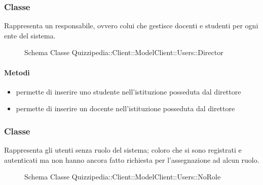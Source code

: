 \subsubsection{Classe }
Rappresenta un responsabile, ovvero colui che gestisce docenti e studenti per ogni ente del sistema.
\begin{figure}[H]
\centering
\noindent{}
\caption[Schema Classe Director]{Schema Classe Quizzipedia::Client::ModelClient::Users::Director}
\end{figure}
\paragraph{Metodi}
\begin{itemize}
\item {}
\newline
permette di inserire uno studente nell'istituzione posseduta dal direttore
\newline
\item {}
\newline
permette di inserire un docente nell'istituzione posseduta dal direttore
\newline
\end{itemize}
\subsubsection{Classe }
Rappresenta gli utenti senza ruolo del sistema; coloro che si sono registrati e autenticati ma non hanno ancora fatto richiesta per l'assegnazione ad alcun ruolo.
\begin{figure}[H]
\centering
\noindent{}
\caption[Schema Classe NoRole]{Schema Classe Quizzipedia::Client::ModelClient::Users::NoRole}
\end{figure}

